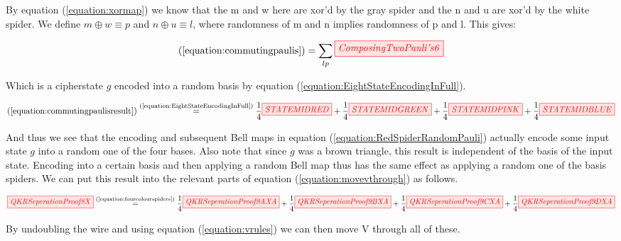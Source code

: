 \documentclass[]{article}
\newcommand{\equaltext}[1]{\ensuremath{\stackrel{\text{#1}}{=}}}
\begin{document}
By equation (\ref{equation:xormap}) we know that the m and w here are xor'd by the gray spider and the n and u are xor'd by the white spider. We define $m \oplus w \equiv p$ and $n \oplus u \equiv l$, where randomness of m and n implies randomness of p and l. This gives:

\begin{equation}
	\label{equation:commutingpaulisresult}
	(\ref{equation:commutingpaulis}) = \sum\limits_{lp} \tikzfig{ComposingTwoPauli's6}
\end{equation}

Which is a cipherstate $g$ encoded into a random basis by equation (\ref{equation:EightStateEncodingInFull}).

\begin{equation}
	\label{equation:fourcolourspiders}
	(\ref{equation:commutingpaulisresult}) \equaltext{(\ref{equation:EightStateEncodingInFull})}
	 \frac{1}{4}\tikzfig{STATEMIDRED} +
	 \frac{1}{4}\tikzfig{STATEMIDGREEN} +
	 \frac{1}{4}\tikzfig{STATEMIDPINK}+
	 \frac{1}{4}\tikzfig{STATEMIDBLUE}	
\end{equation}

And thus we see that the encoding and subsequent Bell maps in equation (\ref{equation:RedSpiderRandomPauli}) actually encode some input state $g$ into a random one of the four bases. Also note that since $g$ was a brown triangle, this result is independent of the basis of the input state. Encoding into a certain basis and then applying a random Bell map thus has the same effect as applying a random one of the basis spiders. We can put this result into the relevant parts of equation (\ref{equation:movevthrough}) as follows.

\begin{equation}
	\label{equation:QKRSeperationProof}
	\tikzfig{QKRSeperationProof8X} \equaltext{(\ref{equation:fourcolourspiders})} \frac{1}{4}\tikzfig{QKRSeperationProof9AXA} + \frac{1}{4} \tikzfig{QKRSeperationProof9BXA} + \frac{1}{4} \tikzfig{QKRSeperationProof9CXA} + \frac{1}{4} \tikzfig{QKRSeperationProof9DXA}
\end{equation}

By undoubling the wire and using equation (\ref{equation:vrules}) we can then move V through all of these.
\end{document}
